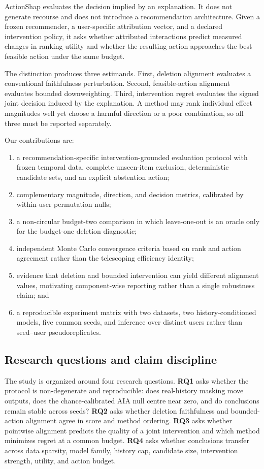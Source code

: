 \documentclass[pdflatex,sn-basic]{sn-jnl}
\begin{document}
ActionShap evaluates the decision implied by an explanation. It does not generate recourse and does not introduce a recommendation architecture. Given a frozen recommender, a user-specific attribution vector, and a declared intervention policy, it asks whether attributed interactions predict measured changes in ranking utility and whether the resulting action approaches the best feasible action under the same budget.

The distinction produces three estimands. First, deletion alignment evaluates a conventional faithfulness perturbation. Second, feasible-action alignment evaluates bounded downweighting. Third, intervention regret evaluates the signed joint decision induced by the explanation. A method may rank individual effect magnitudes well yet choose a harmful direction or a poor combination, so all three must be reported separately.

Our contributions are:
\begin{enumerate}
  \item a recommendation-specific intervention-grounded evaluation protocol with frozen temporal data, complete unseen-item exclusion, deterministic candidate sets, and an explicit abstention action;
  \item complementary magnitude, direction, and decision metrics, calibrated by within-user permutation nulls;
  \item a non-circular budget-two comparison in which leave-one-out is an oracle only for the budget-one deletion diagnostic;
  \item independent Monte Carlo convergence criteria based on rank and action agreement rather than the telescoping efficiency identity;
  \item evidence that deletion and bounded intervention can yield different alignment values, motivating component-wise reporting rather than a single robustness claim; and
  \item a reproducible experiment matrix with two datasets, two history-conditioned models, five common seeds, and inference over distinct users rather than seed--user pseudoreplicates.
\end{enumerate}

\subsection*{Research questions and claim discipline}
The study is organized around four research questions. \textbf{RQ1} asks whether the protocol is non-degenerate and reproducible: does real-history masking move outputs, does the chance-calibrated AIA null centre near zero, and do conclusions remain stable across seeds? \textbf{RQ2} asks whether deletion faithfulness and bounded-action alignment agree in score and method ordering. \textbf{RQ3} asks whether pointwise alignment predicts the quality of a joint intervention and which method minimizes regret at a common budget. \textbf{RQ4} asks whether conclusions transfer across data sparsity, model family, history cap, candidate size, intervention strength, utility, and action budget.
\end{document}
